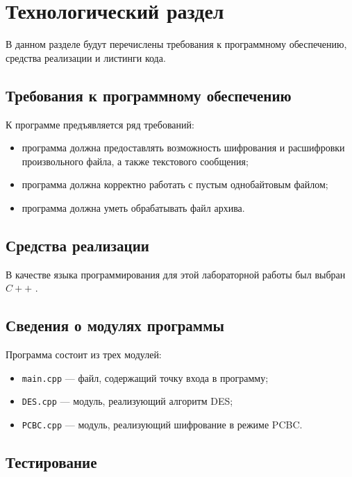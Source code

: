 \chapter{Технологический раздел}

В данном разделе будут перечислены требования к программному обеспечению, средства реализации и листинги кода.

\section{Требования к программному обеспечению}

К программе предъявляется ряд требований:

\begin{itemize} [label=--]
	\item программа должна предоставлять возможность шифрования и расшифровки произвольного файла, а также текстового сообщения;
	\item программа должна корректно работать с пустым однобайтовым файлом;
	\item программа должна уметь обрабатывать файл архива.
\end{itemize}

\section{Средства реализации}

В качестве языка программирования для этой лабораторной работы был выбран $C++$ \cite{pl}.

\section{Сведения о модулях программы}

Программа состоит из трех модулей: 

\begin{itemize}
	\item \texttt{main.cpp} --- файл, содержащий точку входа в программу;
	\item \texttt{DES.cpp} --- модуль, реализующий алгоритм DES;
	\item \texttt{PCBC.cpp} --- модуль, реализующий шифрование в режиме PCBC.
\end{itemize}

\section{Тестирование}

